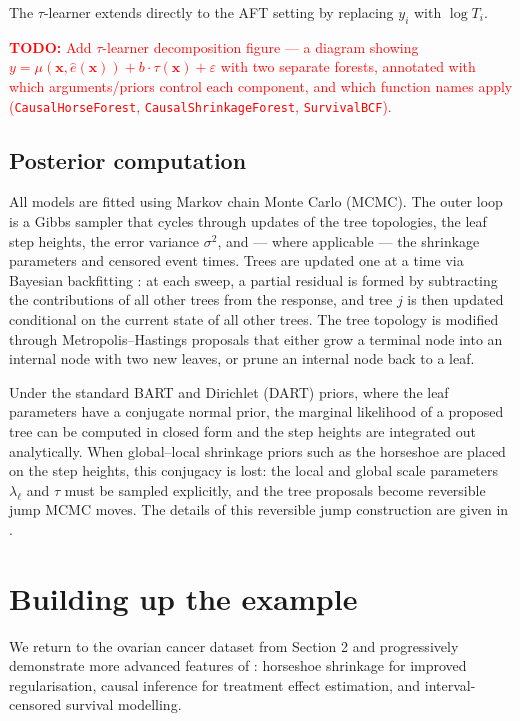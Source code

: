 The \(\tau\)-learner extends directly to the AFT setting by replacing \(y_i\) with \(\log T_i\).

\textcolor{red}{\textbf{TODO:} Add $\tau$-learner decomposition figure — a diagram showing $y = \mu(\mathbf{x}, \hat{e}(\mathbf{x})) + b \cdot \tau(\mathbf{x}) + \varepsilon$ with two separate forests, annotated with which arguments/priors control each component, and which function names apply (\texttt{CausalHorseForest}, \texttt{CausalShrinkageForest}, \texttt{SurvivalBCF}).}

\subsection{Posterior computation}\label{posterior-computation}

All models are fitted using Markov chain Monte Carlo (MCMC). The outer loop is a Gibbs sampler that cycles through updates of the tree topologies, the leaf step heights, the error variance \(\sigma^2\), and --- where applicable --- the shrinkage parameters and censored event times. Trees are updated one at a time via Bayesian backfitting \citep{chipman2010bart}: at each sweep, a partial residual is formed by subtracting the contributions of all other trees from the response, and tree \(j\) is then updated conditional on the current state of all other trees. The tree topology is modified through Metropolis--Hastings proposals that either grow a terminal node into an internal node with two new leaves, or prune an internal node back to a leaf.

Under the standard BART and Dirichlet (DART) priors, where the leaf parameters have a conjugate normal prior, the marginal likelihood of a proposed tree can be computed in closed form and the step heights are integrated out analytically. When global--local shrinkage priors such as the horseshoe are placed on the step heights, this conjugacy is lost: the local and global scale parameters \(\lambda_\ell\) and \(\tau\) must be sampled explicitly, and the tree proposals become reversible jump MCMC moves. The details of this reversible jump construction are given in \citet{jacobs2025horseshoe}.

\section{Building up the example}\label{building-up-the-example}

We return to the ovarian cancer dataset from Section 2 and progressively demonstrate more advanced features of : horseshoe shrinkage for improved regularisation, causal inference for treatment effect estimation, and interval-censored survival modelling.

